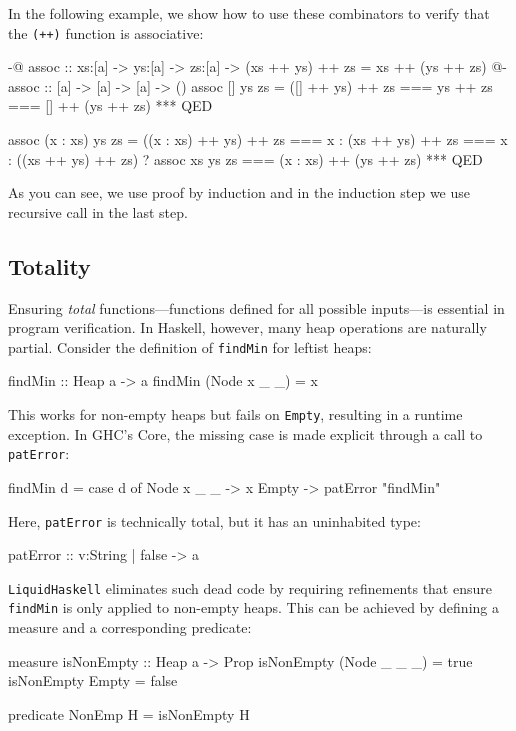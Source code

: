 In the following example, we show how to use these combinators to verify that the \texttt{(++)} function is associative:


\begin{code}[label=lst:associative]
	{-@ assoc :: xs:[a] -> ys:[a] -> zs:[a]
	-> { (xs ++ ys) ++ zs = xs ++ (ys ++ zs) } @-}
	assoc :: [a] -> [a] -> [a] -> ()
	assoc [] ys zs = ([] ++ ys) ++ zs
	=== ys ++ zs
	=== [] ++ (ys ++ zs)
	*** QED

	assoc (x : xs) ys zs = ((x : xs) ++ ys) ++ zs
	===  x : (xs ++ ys) ++ zs
	=== x : ((xs ++ ys) ++ zs) ? assoc xs ys zs
	=== (x : xs) ++ (ys ++ zs)
	*** QED
\end{code}
\vspace{1em}

As you can see, we use proof by induction and in the induction step we use recursive call in the last step.

\subsection{Totality}
Ensuring \emph{total} functions—functions defined for all possible inputs—is essential in program verification.
In Haskell, however, many heap operations are naturally partial.
Consider the definition of \texttt{findMin} for leftist heaps:

\begin{code}
  findMin :: Heap a -> a
  findMin (Node x _ _) = x
\end{code}

This works for non-empty heaps but fails on \texttt{Empty}, resulting in a runtime exception.
In GHC’s Core, the missing case is made explicit through a call to \texttt{patError}:

\begin{code}
  findMin d = case d of
  Node x _ _ -> x
  Empty -> patError "findMin"
\end{code}

Here, \texttt{patError} is technically total, but it has an uninhabited type:

\begin{code}
  patError :: {v:String | false} -> a
\end{code}

\texttt{LiquidHaskell} eliminates such dead code by requiring refinements that ensure \texttt{findMin} is only applied to non-empty heaps.
This can be achieved by defining a measure and a corresponding predicate:

\begin{code}
  measure isNonEmpty :: Heap a -> Prop
  isNonEmpty (Node _ _ _) = true
  isNonEmpty Empty = false

  predicate NonEmp H = isNonEmpty H
\end{code}

